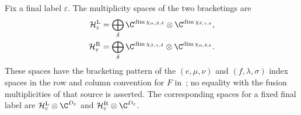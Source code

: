 \begin{definition}%
    \label{def:mpdo_final_sector_multiplicity_spaces}
    \leanok
    Fix a final label $\varepsilon$. The multiplicity spaces of the two
    bracketings are
    \begin{align}
        \mathcal H^{\mathrm L}_{\varepsilon}
         & =\bigoplus_{\delta}
        \C^{\dim\chi_{\alpha,\beta,\delta}}
        \otimes \C^{\dim\chi_{\delta,\gamma,\varepsilon}},
        \notag                 \\
        \mathcal H^{\mathrm R}_{\varepsilon}
         & =\bigoplus_{\delta}
        \C^{\dim\chi_{\beta,\gamma,\delta}}
        \otimes \C^{\dim\chi_{\alpha,\delta,\varepsilon}}.
        \notag
    \end{align}
    These spaces have the bracketing pattern of the $(e,\mu,\nu)$ and
    $(f,\lambda,\sigma)$ index spaces in the row and column convention for
    $F$ in~\cite[Section~3.4]{Bultinck2017Anyons}; no equality with the fusion
    multiplicities of that source is asserted. The corresponding spaces for a
    fixed final label are $\mathcal H^{\mathrm L}_{\varepsilon}\otimes\C^{D_\varepsilon}$
    and $\mathcal H^{\mathrm R}_{\varepsilon}\otimes\C^{D_\varepsilon}$.
\end{definition}


